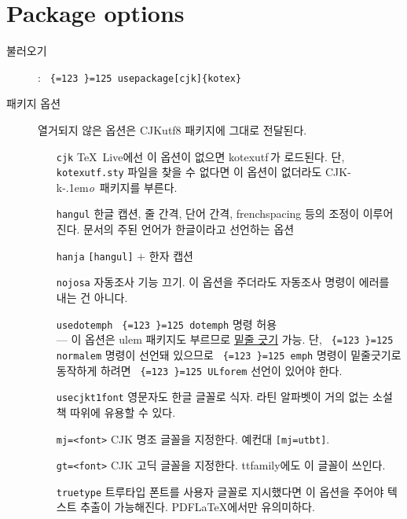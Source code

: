 \documentclass[dvipdfmx,b5paper]{article}
\def\cs#1{\texttt{\color{teal}\char92 \chardef\{=123 \chardef\}=125 #1}}
\def\cjkko{\mbox{CJK-\textsf{k}\kern-.1em\textit{o}}}
\begin{document}
\section{Package options}
  \begin{description}
    \item[불러오기]: \quad\cs{usepackage[cjk]\{kotex\}}
      \medskip
    \item[패키지 옵션] 열거되지 않은 옵션은 CJKutf8 패키지에 그대로 전달된다.
      \begin{itemize}
        \item[\texttt{cjk}] \TeX\ Live에선 이 옵션이 없으면 kotexutf\,가
          로드된다. 단, \verb|kotexutf.sty| 파일을 찾을 수 없다면
          이 옵션이 없더라도 \cjkko\ 패키지를 부른다.
        \item[\texttt{hangul}] 한글 캡션, 줄 간격, 단어 간격, frenchspacing
          등의 조정이 이루어진다. 문서의 주된 언어가 한글이라고 선언하는 옵션
        \item[\texttt{hanja}] \verb|[hangul]| $+$ 한자 캡션
        \item[\texttt{nojosa}] 자동조사 기능 끄기. 이 옵션을 주더라도
          자동조사 명령이 에러를 내는 건 아니다.
        \item[\texttt{usedotemph}] \cs{dotemph} 명령 허용\\
          --- 이 옵션은 ulem 패키지도 부르므로 \uline{밑줄 긋기} 가능.
          단, \cs{normalem} 명령이 선언돼 있으므로 \cs{emph} 명령이
          밑줄긋기로 동작하게 하려면 \cs{ULforem} 선언이 있어야 한다.
        \item[\texttt{usecjkt1font}] 영문자도 한글 글꼴로 식자.
           라틴 알파벳이 거의 없는 소설책 따위에 유용할 수 있다.
        \item[\texttt{mj=<font>}] CJK 명조 글꼴을 지정한다. 예컨대
          \verb|[mj=utbt]|.
        \item[\texttt{gt=<font>}] CJK 고딕 글꼴을 지정한다. ttfamily에도
          이 글꼴이 쓰인다.
        \item[\texttt{truetype}] 트루타입 폰트를 사용자 글꼴로 지시했다면
          이 옵션을 주어야 텍스트 추출이 가능해진다. PDF\LaTeX 에서만 유의미하다.
      \end{itemize}
  \end{description}
\end{document}
